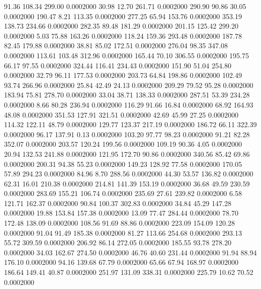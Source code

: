   91.36  108.34  299.00   0.0002000
  30.98   12.70  261.71   0.0002000
 290.90   90.86   30.05   0.0002000
 190.47    8.21  113.35   0.0002000
 277.25   65.94  153.76   0.0002000
 353.19  138.73  234.66   0.0002000
 282.35   89.48  181.29   0.0002000
 201.15  125.42  299.20   0.0002000
   5.03   75.88  163.26   0.0002000
 118.24  159.36  293.48   0.0002000
 187.78   82.45  179.88   0.0002000
  38.81   85.02  172.51   0.0002000
 276.04   98.35  347.08   0.0002000
 113.61  103.48  312.96   0.0002000
 165.44   70.10  306.55   0.0002000
 195.75   66.17   97.55   0.0002000
 324.44  116.41  234.43   0.0002000
 151.90   51.04  254.80   0.0002000
  32.79   96.11  177.53   0.0002000
 203.73   64.84  198.86   0.0002000
 102.49   93.74  266.96   0.0002000
  25.84   42.49   24.13   0.0002000
 209.29   79.52   95.28   0.0002000
 183.94   75.81  278.70   0.0002000
  33.04   38.71  138.33   0.0002000
 287.51   53.39  234.28   0.0002000
   8.66   80.28  236.94   0.0002000
 116.29   91.66   16.84   0.0002000
  68.92  164.93   48.08   0.0002000
 351.53  127.91  321.51   0.0002000
  42.69   45.99   27.25   0.0002000
 114.32  122.11   48.79   0.0002000
 129.77  123.37  217.19   0.0002000
 186.72   66.11  322.39   0.0002000
  96.17  137.91    0.13   0.0002000
 103.20   97.77   98.23   0.0002000
  91.21   82.28  352.07   0.0002000
 203.57  120.24  199.56   0.0002000
 109.19   90.36    4.05   0.0002000
  20.94  132.53  241.88   0.0002000
 121.95  172.70   90.86   0.0002000
 340.56   85.42   69.86   0.0002000
 200.31   94.38   55.23   0.0002000
 149.23  128.92   77.58   0.0002000
 170.05   57.89  294.23   0.0002000
  84.96    8.70  288.56   0.0002000
  44.30   53.57  136.82   0.0002000
  62.31   16.01  210.38   0.0002000
 214.81  141.39  153.19   0.0002000
  36.68   49.59  230.59   0.0002000
 283.69  155.21  106.74   0.0002000
 235.69   27.61  239.82   0.0002000
   6.58  121.71  162.37   0.0002000
  90.84  100.37  302.83   0.0002000
  34.84   45.29  147.28   0.0002000
  19.88  153.84  157.38   0.0002000
  13.09   77.47  284.44   0.0002000
  78.70  172.48  138.09   0.0002000
 108.56   91.69   88.86   0.0002000
 223.09  154.09  120.28   0.0002000
  91.04   91.49  185.38   0.0002000
  81.27  113.66  254.68   0.0002000
 293.13   55.72  309.59   0.0002000
 206.92   86.14  272.05   0.0002000
 185.55   93.78  278.20   0.0002000
  34.03  162.67  274.50   0.0002000
  46.76   40.60  231.44   0.0002000
  91.94   88.94  176.10   0.0002000
  94.16  139.68   67.79   0.0002000
  65.66   67.94  168.97   0.0002000
 186.64  149.41   40.87   0.0002000
 251.97  131.09  338.31   0.0002000
 225.79   10.62   70.52   0.0002000

